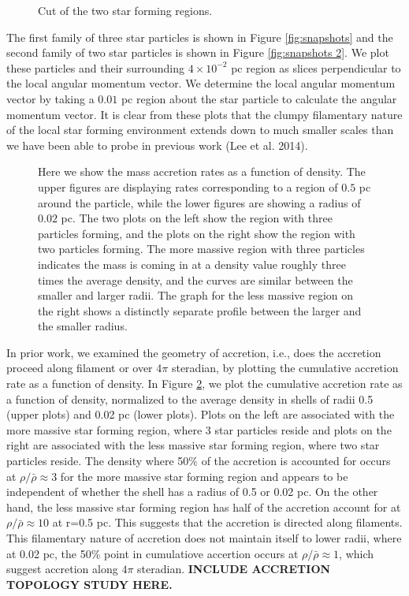 \documentclass{emulateapj}
\begin{document}
\begin{figure}
\caption{Cut of the two star forming regions.\label{fig:star forming regions}}
\end{figure}

The first family of three star particles is shown in Figure \ref{fig:snapshots} and the second family of two star particles is shown in Figure \ref{fig:snapshots 2}.  We plot these particles and their surrounding $4\times 10^{-2}$ pc region as slices perpendicular to the local angular momentum vector.  We determine the local angular momentum vector by taking a $0.01$ pc region about the star particle to calculate the angular momentum vector.  It is clear from these plots that the clumpy filamentary nature of the local star forming environment extends down to much smaller scales than we have been able to probe in previous work (Lee et al. 2014).  

\begin{figure}
\caption{Here we show the mass accretion rates as a function of density.  The upper figures are displaying rates corresponding to a region of $0.5$ pc around the particle, while the lower figures are showing a radius of $0.02$ pc.  The two plots on the left show the region with three particles forming, and the plots on the right show the region with two particles forming.  The more massive region with three particles indicates the mass is coming in at a density value roughly three times the average density, and the curves are similar between the smaller and larger radii.  The graph for the less massive region on the right shows a distinctly separate profile between the larger and the smaller radius.   \label{fig:accretion average rho}}
\end{figure}

In prior work, we examined the geometry of accretion, i.e., does the accretion proceed along filament or over 4$\pi$ steradian, by plotting the cumulative accretion rate as a function of density. In Figure \ref{fig:accretion average rho}, we plot the cumulative accretion rate as a function of density, normalized to the average density in shells of radii 0.5 (upper plots) and 0.02 pc (lower plots).  Plots on the left are associated with the more massive star forming region, where 3 star particles reside and plots on the right are associated with the less massive star forming region, where two star particles reside.  The density where 50\% of the accretion is accounted for occurs at $\rho/\bar{\rho} \approx 3$ for the more massive star forming region and appears to be independent of whether the shell has a radius of 0.5 or 0.02 pc.  On the other hand, the less massive star forming region has half of the accretion account for at $\rho/\bar{\rho} \approx 10$ at r=0.5 pc.  This suggests that the accretion is directed along filaments.  This filamentary nature of accretion does not maintain itself to lower radii, where at 0.02 pc, the 50\% point in cumulatiove accertion occurs at $\rho/\bar{\rho} \approx 1$, which suggest accretion along $4\pi$ steradian.
{\bf INCLUDE ACCRETION TOPOLOGY STUDY HERE.}
\end{document}

